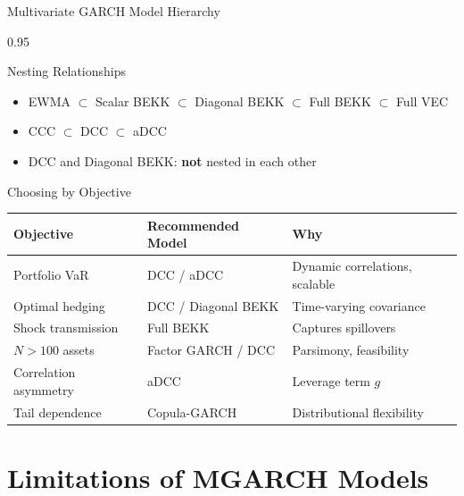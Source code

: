 \documentclass[9pt, aspectratio=169, t]{beamer}
\begin{document}
\begin{frame}{Multivariate GARCH Model Hierarchy}
    \begin{cminipage}{0.95\textwidth}
    {\footnotesize
    \begin{block}{Nesting Relationships}
        \begin{itemize}\setlength{\itemsep}{0pt}
            \item EWMA $\subset$ Scalar BEKK $\subset$ Diagonal BEKK $\subset$ Full BEKK $\subset$ Full VEC
            \item CCC $\subset$ DCC $\subset$ aDCC
            \item DCC and Diagonal BEKK: \textbf{not} nested in each other
        \end{itemize}
    \end{block}
    \begin{block}{Choosing by Objective}
        \vspace{0.1cm}
        \begin{center}
        {\scriptsize
        \begin{tabular}{lll}
            \hline
            \textbf{Objective} & \textbf{Recommended Model} & \textbf{Why} \\
            \hline
            Portfolio VaR & DCC / aDCC & Dynamic correlations, scalable \\
            Optimal hedging & DCC / Diagonal BEKK & Time-varying covariance \\
            Shock transmission & Full BEKK & Captures spillovers \\
            $N > 100$ assets & Factor GARCH / DCC & Parsimony, feasibility \\
            Correlation asymmetry & aDCC & Leverage term $g$ \\
            Tail dependence & Copula-GARCH & Distributional flexibility \\
            \hline
        \end{tabular}
        }
        \end{center}
    \end{block}
    }
    \end{cminipage}
\end{frame}

\section{Limitations of MGARCH Models}
\end{document}
